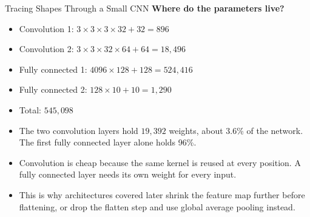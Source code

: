 \begin{frame}[allowframebreaks]{Tracing Shapes Through a Small CNN}
    \textbf{Where do the parameters live?}
    \begin{itemize}
        \item Convolution 1: $3 \times 3 \times 3 \times 32 + 32 = 896$
        \item Convolution 2: $3 \times 3 \times 32 \times 64 + 64 = 18{,}496$
        \item Fully connected 1: $4096 \times 128 + 128 = 524{,}416$
        \item Fully connected 2: $128 \times 10 + 10 = 1{,}290$
        \item Total: $545{,}098$
    \end{itemize}

    \vspace{0.5em}
    \begin{itemize}
        \item The two convolution layers hold $19{,}392$ weights, about 3.6\% of the network. The first fully connected layer alone holds 96\%.
        \item Convolution is cheap because the same kernel is reused at every position. A fully connected layer needs its own weight for every input.
        \item This is why architectures covered later shrink the feature map further before flattening, or drop the flatten step and use global average pooling instead.
    \end{itemize}
\end{frame}
